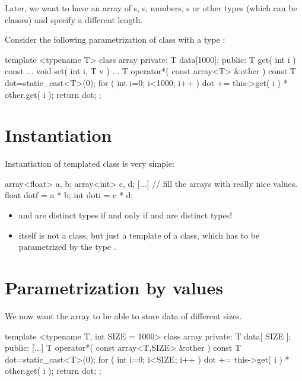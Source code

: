 Later, we want to have an array of s, s,  numbers,
s or other types (which can be classes) and specify a different length.


Consider the following parametrization of class  with a type :

\begin{myverbatim}
template <typename T>
class array {
  private:
    T data[1000];
  public:
    T get( int i ) const { ... }
    void set( int i, T v ) { ... }
    T operator*( const array<T> &other ) const {
      T dot=static_cast<T>(0);
      for ( int i=0; i<1000; i++ ) {
        dot += this->get( i ) * other.get( i );
      }
      return dot;
    }
};
\end{myverbatim}


\section{Instantiation}

Instantiation of templated class is very simple:
\begin{myverbatim}
array<float> a, b;
array<int> c, d;
[...] // fill the arrays with really nice values.
float dotf = a * b;
int doti = c * d;
\end{myverbatim}

\begin{itemize}
\item {} and  are distinct types if and only if  and  are distinct types!
\item {} itself is not a class, but just a template of a class, which has to be parametrized by the type .
\end{itemize}



\section{Parametrization by values}

We now want the array to be able to store data of different sizes.
\begin{myverbatim}
template <typename T, int SIZE = 1000>
class array {
  private:
    T data[ SIZE ];
  public:
    [...]
    T operator*( const array<T,SIZE> &other ) const {
      T dot=static_cast<T>(0);
      for ( int i=0; i<SIZE; i++ ) {
        dot += this->get( i ) * other.get( i );
      }
      return dot;
    }
};
\end{myverbatim}

